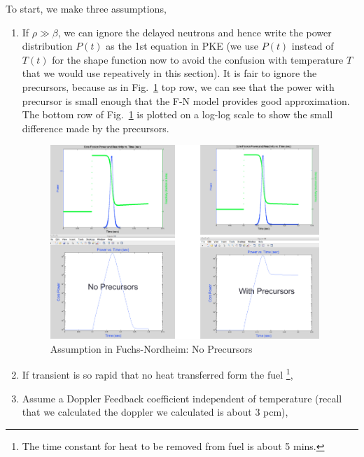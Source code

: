 \documentclass{school-22.211-notes}
\begin{document}
To start, we make three assumptions, 
\begin{enumerate}
\item If $\rho \gg \beta$, we can ignore the delayed neutrons and hence write the power distribution $P(t)$ as the 1st equation in PKE (we use $P(t)$ instead of $T(t)$ for the shape function now to avoid the confusion with temperature $T$ that we would use repeatively in this section). 
  It is fair to ignore the precursors, because as in Fig.~\ref{fn1} top row, we can see that the power with precursor is small enough that the F-N model provides good approximation. The bottom row of Fig.~\ref{fn1} is plotted on a log-log scale to show the small difference made by the precursors.  
\begin{figure}[ht]
  \centering
  \includegraphics[width=4in]{images/pke/fn1.png}
  \caption{Assumption in Fuchs-Nordheim: No Precursors}\label{fn1}
\end{figure}

\item If transient is so rapid that no heat transferred form the fuel \footnote{The time constant for heat to be removed from  fuel is about 5 mins.}, 

\item Assume a Doppler Feedback coefficient independent of temperature (recall that we calculated the doppler we calculated is about 3 pcm), 
\end{enumerate}
\end{document}
